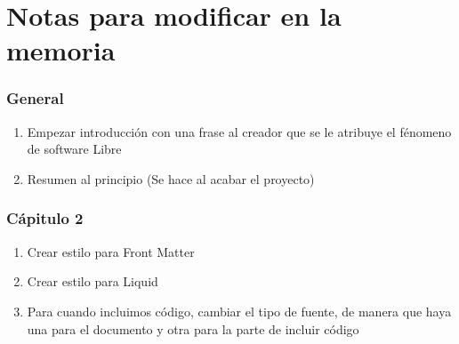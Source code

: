 
\chapter*{Notas para modificar en la memoria}
\subsection*{General}
\begin{enumerate}
    \item Empezar introducción con una frase al creador que se le atribuye el fénomeno de  software Libre
    \item Resumen al principio (Se hace al acabar el proyecto)
\end{enumerate}
\subsection*{Cápitulo 2}
\begin{enumerate}
    \item Crear estilo para Front Matter
    \item Crear estilo para Liquid
    \item Para cuando incluimos código, cambiar el tipo de fuente, de manera que haya una para el documento y otra para la parte de incluir código
\end{enumerate}
